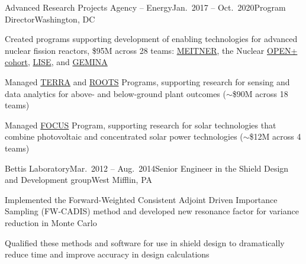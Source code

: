 
\begin{rSubsection}{Advanced Research Projects Agency -- Energy}{Jan.\ 2017 -- Oct.\ 2020}{Program Director}{Washington, DC}
\item Created programs supporting development of enabling technologies for advanced nuclear fission reactors, \$95M across 28 teams: 
\href{https://arpa-e.energy.gov/?q=arpa-e-programs/meitner}{MEITNER}, the
Nuclear
\href{https://arpa-e.energy.gov/?q=news-item/arpa-e-announces-12-million-five-projects-nuclear-materials-science}{OPEN+
cohort},
\href{https://arpa-e.energy.gov/?q=news-item/arpa-e-innovating-through-unconventional-ideas}{LISE}, and  \href{https://arpa-e.energy.gov/technologies/programs/gemina}{GEMINA}
\item Managed \href{https://arpa-e.energy.gov/?q=arpa-e-programs/terra}{TERRA} and \href{https://arpa-e.energy.gov/?q=arpa-e-programs/roots}{ROOTS} Programs, supporting research for sensing and data analytics for above- and below-ground plant outcomes ($\sim$\$90M across 18 teams)
\item Managed \href{https://arpa-e.energy.gov/?q=arpa-e-programs/focus}{FOCUS} Program, supporting research for solar technologies that combine photovoltaic and concentrated solar power technologies ($\sim$\$12M across 4 teams)
\end{rSubsection}


\begin{rSubsection}{Bettis Laboratory}{Mar.\ 2012 -- Aug.\ 2014}{Senior Engineer in the Shield Design and Development group}{West Mifflin, PA}
\item Implemented the Forward-Weighted Consistent Adjoint Driven Importance Sampling (FW-CADIS) method and developed new resonance factor for variance reduction in Monte Carlo
\item Qualified these methods and software for use in shield design to dramatically reduce time and improve accuracy in design calculations
\end{rSubsection}

